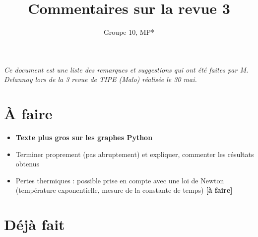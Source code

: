 \documentclass{article}
\title{Commentaires sur la revue 3}
\author{Groupe 10, MP*}
\begin{document}
\maketitle

\textit{Ce document est une liste des remarques et suggestions qui ont été faites par M. Delannoy lors de la 3 revue de TIPE (Malo) réalisée le 30 mai.}

\vspace{1cm}

\section*{À faire}

\begin{itemize}
    \item \textbf{Texte plus gros sur les graphes Python}
    \item Terminer proprement (pas abruptement) et expliquer, commenter les résultats obtenus
    \item Pertes thermiques : possible prise en compte avec une loi de Newton (température exponentielle, mesure de la constante de temps) \textbf{[à faire]}
\end{itemize}

\section*{Déjà fait}
\end{document}
